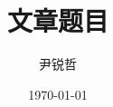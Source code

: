 \documentclass[a4paper,notitlepage,UTF8,zihao=5,onecolumn]{article}
\begin{document}
	\title{文章题目\vspace{0pt}}
	\author{尹锐哲}
	\date{\today}
	
	\maketitle
	
\end{document}

